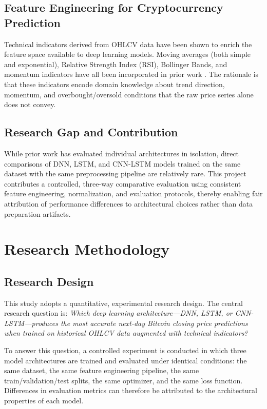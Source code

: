 \documentclass[12pt]{article}
\begin{document}
\subsection{Feature Engineering for Cryptocurrency Prediction}

Technical indicators derived from OHLCV data have been shown to enrich the feature space available to deep learning models. Moving averages (both simple and exponential), Relative Strength Index (RSI), Bollinger Bands, and momentum indicators have all been incorporated in prior work \cite{chen2020}. The rationale is that these indicators encode domain knowledge about trend direction, momentum, and overbought/oversold conditions that the raw price series alone does not convey.

\subsection{Research Gap and Contribution}

While prior work has evaluated individual architectures in isolation, direct comparisons of DNN, LSTM, and CNN-LSTM models trained on the same dataset with the same preprocessing pipeline are relatively rare. This project contributes a controlled, three-way comparative evaluation using consistent feature engineering, normalization, and evaluation protocols, thereby enabling fair attribution of performance differences to architectural choices rather than data preparation artifacts.

\section{Research Methodology}

\subsection{Research Design}

This study adopts a quantitative, experimental research design. The central research question is: \textit{Which deep learning architecture---DNN, LSTM, or CNN-LSTM---produces the most accurate next-day Bitcoin closing price predictions when trained on historical OHLCV data augmented with technical indicators?}

To answer this question, a controlled experiment is conducted in which three model architectures are trained and evaluated under identical conditions: the same dataset, the same feature engineering pipeline, the same train/validation/test splits, the same optimizer, and the same loss function. Differences in evaluation metrics can therefore be attributed to the architectural properties of each model.
\end{document}
